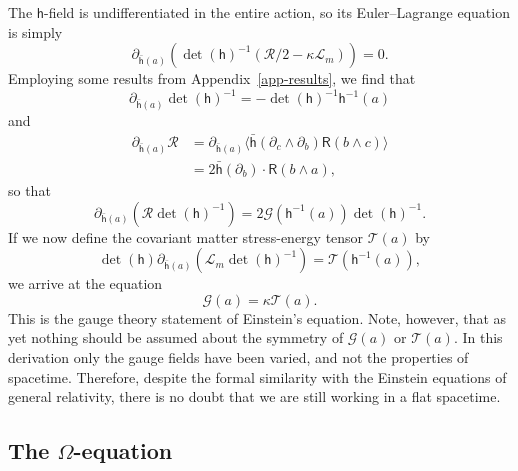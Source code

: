 \documentclass[a4paper]{article}
\numberwithin{equation}{section}
\newcommand{\nn}{\nonumber}
\newcommand{\dt}{\! \cdot \!}
\newcommand{\wdg}{\! \wedge \!}
\newcommand{\la}{\langle}
\newcommand{\ra}{\rangle}
\newcommand{\kap}{\kappa}
\newcommand{\Om}{\Omega}
\newcommand{\clg}{{\mathcal{G}}}
\newcommand{\cll}{{\mathcal{L}}}
\newcommand{\clr}{{\mathcal{R}}}
\newcommand{\clt}{{\mathcal{T}}}
\newcommand{\db}{\partial_b}
\newcommand{\dc}{\partial_c}
\newcommand{\lih}{\mathsf{h}}
\newcommand{\lbh}{\bar{\mathsf{h}}}
\newcommand{\liR}{\mathsf{R}}
\newcommand{\ho}{\lbh}
\newcommand{\hu}{\lih}
\newcommand{\dhi}{\det(\hu)^{-1}}
\renewcommand{\dh}{\det(\hu)}
\newcommand{\dhoa}{\partial_{\ho(a)}}
\begin{document}
The $\lih$-field is undifferentiated in the entire action, so its
Euler--Lagrange equation is simply
%
\begin{equation}
\dhoa (\dhi (\clr/2 - \kap \cll_m)) = 0.
\label{F-i1} 
\end{equation}
%
Employing some results from Appendix~\ref{app-results}, we find
that 
%
\begin{equation}
\dhoa \dhi = - \dhi \hu^{-1}(a)
\end{equation}
%
and
%
\begin{align}
\dhoa \clr &= \dhoa \la \ho(\dc \wdg \db) \liR(b\wdg c) \ra \nn \\
&= 2 \ho(\db) \dt \liR(b \wdg a), 
\end{align}
%
so that 
%
\begin{equation}
\dhoa (\clr \dhi) = 2 \clg(\hu^{-1}(a)) \dhi.
\end{equation}
%
If we now define the covariant matter stress-energy tensor $\clt(a)$
by
%
\begin{equation}
\dh \dhoa (\cll_m \dhi) = \clt (\hu^{-1}(a)),
\label{F-i2}
\end{equation}
%
we arrive at the equation
%
\begin{equation}
\clg(a) = \kap \clt(a).
\label{einsteqn} 
\end{equation}
%
This is the gauge theory statement of Einstein's equation.  Note,
however, that as yet nothing should be assumed about the symmetry of
$\clg(a)$ or $\clt(a)$.  In this derivation only the gauge fields have
been varied, and not the properties of spacetime.  Therefore, despite
the formal similarity with the Einstein equations of general
relativity, there is no doubt that we are still working in a flat
spacetime.


\subsection[The $\Om$-equation]{The {\boldmath $\Om$}-equation}
\end{document}
